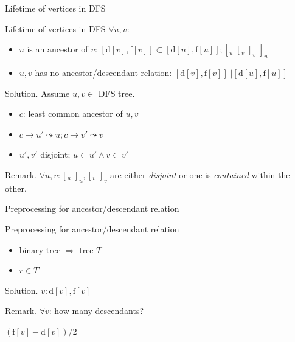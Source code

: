\begin{frame}{Lifetime of vertices in DFS}
  \begin{exampleblock}{Lifetime of vertices in DFS } 
    $\forall u,v$:
    \begin{itemize}
      \item $u$ is an ancestor of $v$: $[\text{d}[v], \text{f}[v]] \subset [\text{d}[u], \text{f}[u]]; [_{u}\; [_{v}\; ]_{v}\; ]_{u}$
      \item $u,v$ has no ancestor/descendant relation: $[\text{d}[v], \text{f}[v]] || [\text{d}[u], \text{f}[u]]$
    \end{itemize}
  \end{exampleblock}

  \begin{block}{Solution.}
    Assume $u, v \in $ DFS tree.

    \begin{itemize}
      \item $c$: least common ancestor of $u,v$ 
      \item $c \to u' \leadsto u; c \to v' \leadsto v$
      \item $u', v'$ disjoint; $u \subset u' \land v \subset v'$
    \end{itemize}
  \end{block}

  \begin{alertblock}{Remark.}
    $\forall u,v: [_{u} \; ]_{u}, [_{v} \; ]_{v}$ are either \emph{disjoint} or one is \emph{contained} within the other.
  \end{alertblock}
\end{frame}
\begin{frame}{Preprocessing for ancestor/descendant relation}
  \begin{exampleblock}{Preprocessing for ancestor/descendant relation }
    \begin{itemize}
      \item binary tree $\Rightarrow$ tree $T$
      \item $r \in T$
    \end{itemize}
  \end{exampleblock}

  \begin{block}{Solution.}
    $v: \text{d}[v], \text{f}[v]$
  \end{block}

  \begin{alertblock}{Remark.}
    $\forall v$: how many descendants?

    $(\text{f}[v] - \text{d}[v]) / 2$
  \end{alertblock}
\end{frame}
